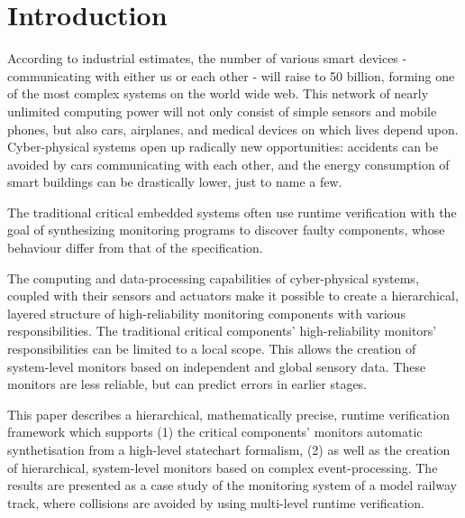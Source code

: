\chapter{Introduction}
\label{chap:introduction}

According to industrial estimates, the number of various smart devices - communicating with either us or each other - will raise to 50 billion, forming one of the most complex systems on the world wide web. This network of nearly unlimited computing power will not only consist of simple sensors and mobile phones, but also cars, airplanes, and medical devices on which lives depend upon. Cyber-physical systems open up radically new opportunities: accidents can be avoided by cars communicating with each other, and the energy consumption of smart buildings can be drastically lower, just to name a few.

The traditional critical embedded systems often use runtime verification with the goal of synthesizing monitoring programs to discover faulty components, whose behaviour differ from that of the specification.

The computing and data-processing capabilities of cyber-physical systems, coupled with their sensors and actuators make it possible to create a hierarchical, layered structure of high-reliability monitoring components with various responsibilities. The traditional critical components' high-reliability monitors' responsibilities can be limited to a local scope. This allows the creation of system-level monitors based on independent and global sensory data. These monitors are less reliable, but can predict errors in earlier stages.

This paper describes a hierarchical, mathematically precise, runtime verification framework which supports (1) the critical components' monitors automatic synthetisation from a high-level statechart formalism, (2) as well as the creation of hierarchical, system-level monitors based on complex event-processing. The results are presented as a case study of the monitoring system of a model railway track, where collisions are avoided by using multi-level runtime verification.

\newpage